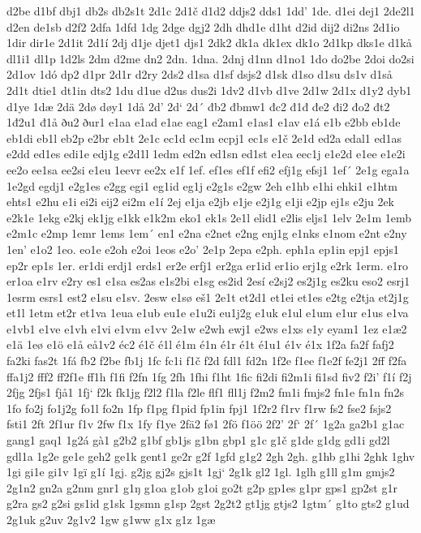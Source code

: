 d2be
d1bf
dbj1
db2s
db2s1t
2d1c
2d1č
d1d2
ddjs2
dds1
1dd'
1de.
d1ei
dej1
2de2l1
d2en
de1sb
d2f2
2dfa
1dfd
1dg
2dge
dgj2
2dh
dhd1e
d1ht
d2id
dij2
di2ns
2d1io
1dir
dir1e
2d1it
2d1í
2dj
d1je
djet1
djs1
2dk2
dk1a
dk1ex
dk1o
2d1kp
dks1e
d1kå
dl1i1
dl1p
1d2ls
2dm
d2me
dn2
2dn.
1dna.
2dnj
d1nn
d1no1
1do
do2be
2doi
do2si
2d1ov
1dó
dp2
d1pr
2d1r
d2ry
2ds2
d1sa
d1sf
dsjs2
d1sk
d1so
d1su
ds1v
d1så
2d1t
dtie1
dt1in
dts2
1du
d1ue
d2us
dus2i
1dv2
d1vb
d1ve
2d1w
2d1x
d1y2
dyb1
d1ye
1dæ
2dä
2dø
døy1
1då
2d'
2d`
2d´
đb2
đbmw1
đc2
đ1đ
đe2
đi2
đo2
đt2
1đ2u1
đ1å
ðu2
ður1
e1aa
e1ad
e1ae
eag1
e2am1
e1as1
e1av
e1á
e1b
e2bb
eb1de
eb1di
eb1l
eb2p
e2br
eb1t
2e1c
ec1d
ec1m
ecpj1
ec1s
e1č
2e1d
ed2a
edal1
ed1as
e2dd
ed1es
edi1e
edj1g
e2d1l
1edm
ed2n
ed1sn
ed1st
e1ea
eec1j
e1e2d
e1ee
e1e2i
ee2o
ee1sa
ee2si
e1eu
1eevr
ee2x
e1f
1ef.
ef1es
ef1f
efi2
efj1g
efsj1
1ef´
2e1g
ega1a
1e2gd
egdj1
e2g1es
e2gg
egi1
eg1id
eg1j
e2g1s
e2gw
2eh
e1hb
e1hi
ehki1
e1htm
ehts1
e2hu
e1i
ei2i
eij2
ei2m
e1í
2ej
e1ja
e2jb
e1je
e2j1g
e1ji
e2jp
ej1s
e2ju
2ek
e2k1e
1ekg
e2kj
ek1jg
e1kk
e1k2m
eko1
ek1s
2e1l
elid1
e2lis
eljs1
1elv
2e1m
1emb
e2m1c
e2mp
1emr
1ems
1em´
en1
e2na
e2net
e2ng
enj1g
e1nks
e1nom
e2nt
e2ny
1en'
e1o2
1eo.
eo1e
e2oh
e2oi
1eos
e2o'
2e1p
2epa
e2ph.
eph1a
ep1in
epj1
epjs1
ep2r
ep1s
1er.
er1di
erdj1
erds1
er2e
erfj1
er2ga
er1id
er1io
erj1g
e2rk
1erm.
e1ro
er1oa
e1rv
e2ry
es1
e1sa
es2as
e1s2bi
e1sg
es2id
2esí
e2sj2
es2j1g
es2ku
eso2
esrj1
1esrm
esrs1
est2
e1su
e1sv.
2esw
e1sø
eš1
2e1t
et2d1
et1ei
et1es
e2tg
e2tja
et2j1g
et1l
1etm
et2r
et1va
1eua
e1ub
eu1e
e1u2i
eu1j2g
e1uk
e1ul
e1um
e1ur
e1us
e1va
e1vb1
e1ve
e1vh
e1vi
e1vm
e1vv
2e1w
e2wh
ewj1
e2ws
e1xs
e1y
eyam1
1ez
e1æ2
e1ä
1eø
e1ö
e1å
eå1v2
éc2
é1č
é1l
é1m
é1n
é1r
é1t
é1u1
é1v
é1x
1f2a
fa2f
fafj2
fa2ki
fas2t
1fá
fb2
f2be
fb1j
1fc
fc1i
f1č
f2d
fdl1
fd2n
1f2e
f1ee
f1e2f
fe2j1
2ff
f2fa
ffa1j2
fff2
ff2f1e
ff1h
f1fi
f2fn
1fg
2fh
1fhi
f1ht
1fic
fi2di
fi2m1i
fi1sd
fiv2
f2i'
f1í
f2j
2fjg
2fjs1
fjå1
1fj`
f2k
fk1jg
f2l2
f1la
f2le
flf1
fll1j
f2m2
fm1i
fmjs2
fn1e
fn1n
fn2s
1fo
fo2j
fo1j2g
fo1l
fo2n
1fp
f1pg
f1pid
fp1in
fpj1
1f2r2
f1rv
f1rw
fs2
fse2
fsjs2
fsti1
2ft
2f1ur
f1v
2fw
f1x
1fy
f1ye
2fä2
fø1
2fö
f1öö
2f2'
2f`
2f´
1g2a
ga2b1
g1ac
gang1
gaq1
1g2á
gà1
g2b2
g1bf
gb1js
g1bn
gbp1
g1c
g1č
g1de
g1dg
gd1i
gd2l
gdl1a
1g2e
ge1e
geh2
ge1k
gent1
ge2r
g2f
1gfd
g1g2
2gh
2gh.
g1hb
g1hi
2ghk
1ghv
1gi
gi1e
gi1v
1gï
g1í
1gj.
g2jg
gj2s
gjs1t
1gj`
2g1k
gl2
1gl.
1glh
g1ll
g1m
gmjs2
2g1n2
gn2a
g2nm
gnr1
g1ŋ
g1oa
g1ob
g1oi
go2t
g2p
gp1es
g1pr
gps1
gp2st
g1r
g2ra
gs2
g2si
gs1id
g1sk
1gsmn
g1sp
2gst
2g2t2
gt1jg
gtjs2
1gtm´
g1to
gts2
g1ud
2g1uk
g2uv
2g1v2
1gw
g1ww
g1x
g1z
1gæ
